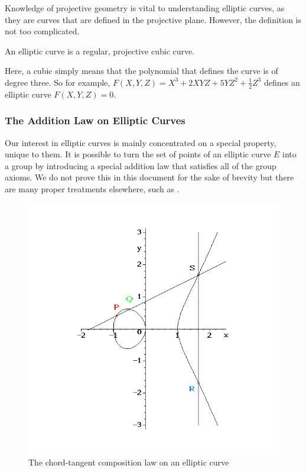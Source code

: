 Knowledge of projective geometry is vital to understanding elliptic curves, as they are curves that are defined in the projective plane.
However, the definition is not too complicated.
\begin{definition}
	An elliptic curve is a regular, projective cubic curve.
\end{definition}
Here, a cubic simply means that the polynomial that defines the curve is of degree three.
So for example, $F(X,Y,Z) = X^3 + 2XYZ + 5YZ^2 + \frac{1}{2}Z^3$ defines an elliptic curve $F(X,Y,Z) = 0$. %
\subsubsection{The Addition Law on Elliptic Curves}
Our interest in elliptic curves is mainly concentrated on a special property, unique to them.
It is possible to turn the set of points of an elliptic curve $E$ into a group by introducing a special addition law that satisfies all of the group axioms.
We do not prove this in this document for the sake of brevity but there are many proper treatments elsewhere, such as \cite{silverman2009}.
\begin{figure}[htpb]
	\centering
	\includegraphics[scale=0.5]{addition.png}
	\caption{The chord-tangent composition law on an elliptic curve}
	\label{chord-tangent}
\end{figure}
